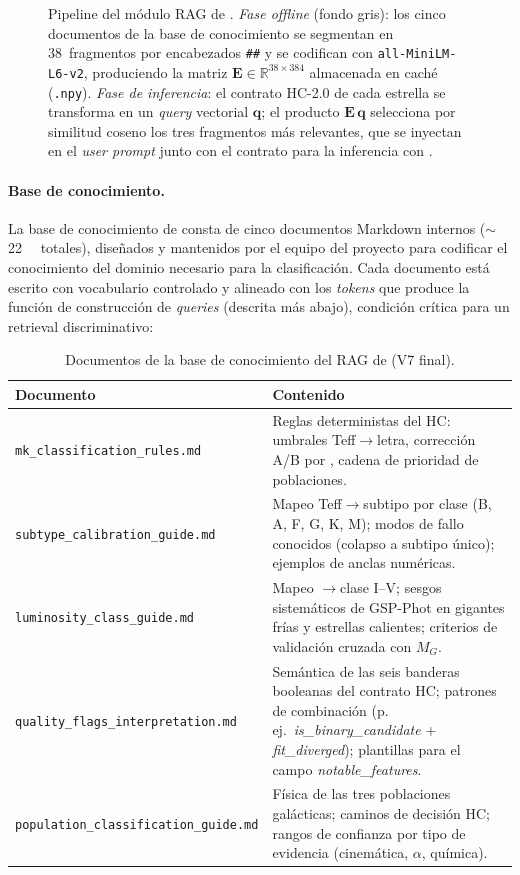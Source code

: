 \begin{figure}[H]
\begin{tikzpicture}
\end{tikzpicture}
\caption{Pipeline del módulo RAG de \STELLAR{}.
  \textit{Fase offline} (fondo gris): los cinco documentos de la base de
  conocimiento se segmentan en \num{38}~fragmentos por encabezados \texttt{\#\#}
  y se codifican con \texttt{all-MiniLM-L6-v2}, produciendo la matriz
  $\mathbf{E}\in\mathbb{R}^{38\times384}$ almacenada en caché (\texttt{.npy}).
  \textit{Fase de inferencia}: el contrato HC-2.0 de cada estrella se transforma
  en un \emph{query} vectorial $\mathbf{q}$; el producto $\mathbf{E}\,\mathbf{q}$
  selecciona por similitud coseno los tres fragmentos más relevantes, que se
  inyectan en el \emph{user prompt} junto con el contrato para la inferencia con
  \AstroSage{}.}
\label{fig:rag-pipeline}
\end{figure}

\paragraph{Base de conocimiento.} La base de conocimiento de \STELLAR{} consta de
cinco documentos Markdown internos ($\sim$\SI{22}{\kilo\byte} totales), diseñados
y mantenidos por el equipo del proyecto para codificar el conocimiento del dominio
necesario para la clasificación. Cada documento está escrito con vocabulario
controlado y alineado con los \emph{tokens} que produce la función de construcción
de \emph{queries} (descrita más abajo), condición crítica para un retrieval
discriminativo:

\begin{table}[H]
  \centering
  \caption{Documentos de la base de conocimiento del RAG de \STELLAR{} (V7 final).}
  \label{tab:kb-docs}
  \begin{tabularx}{\linewidth}{lX}
    \toprule
    Documento & Contenido \\
    \midrule
    \texttt{mk\_classification\_rules.md} &
      Reglas deterministas del HC: umbrales Teff$\rightarrow$letra, corrección
      A/B por \logg{}, cadena de prioridad de poblaciones. \\
    \texttt{subtype\_calibration\_guide.md} &
      Mapeo Teff$\rightarrow$subtipo por clase (B, A, F, G, K, M); modos de
      fallo conocidos (colapso a subtipo único); ejemplos de anclas numéricas. \\
    \texttt{luminosity\_class\_guide.md} &
      Mapeo \logg{}$\rightarrow$clase I--V; sesgos sistemáticos de GSP-Phot en
      gigantes frías y estrellas calientes; criterios de validación cruzada con
      $M_G$. \\
    \texttt{quality\_flags\_interpretation.md} &
      Semántica de las seis banderas booleanas del contrato HC; patrones de
      combinación (p.\,ej.\ \emph{is\_binary\_candidate} + \emph{fit\_diverged});
      plantillas para el campo \emph{notable\_features}. \\
    \texttt{population\_classification\_guide.md} &
      Física de las tres poblaciones galácticas; caminos de decisión HC;
      rangos de confianza por tipo de evidencia (cinemática, $\alpha$, química). \\
    \bottomrule
  \end{tabularx}
\end{table}


